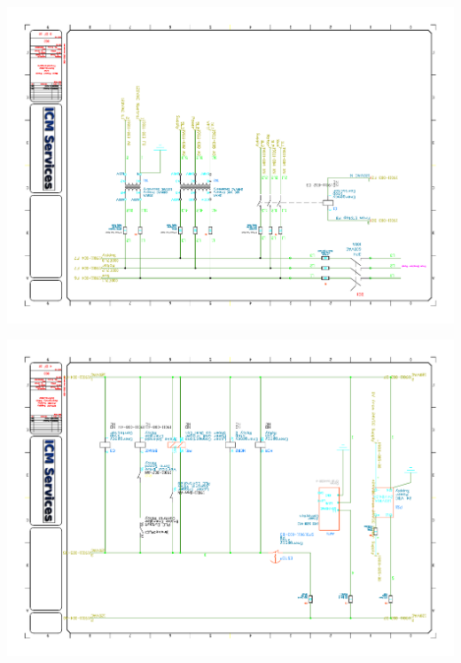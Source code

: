 \begin{center}
	\includegraphics[width=7.5in,angle=90]{../DRAWINGS/19011-002.pdf}
	\label{schem:002} %
\end{center}
\begin{center}
	\includegraphics[width=7.5in,angle=90]{../DRAWINGS/19011-003.pdf}
	\label{schem:003} %
\end{center}

